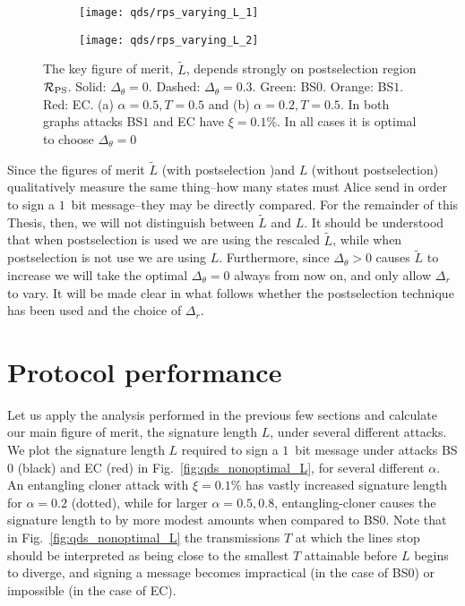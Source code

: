 \begin{figure}[htp]
\captionsetup{width=0.8\linewidth}
\centering
	\begin{subfigure}{0.49\linewidth}
		\centering
		\texttt{[image: qds/rps\_varying\_L\_1]}
		\caption{}
	\end{subfigure}
	\begin{subfigure}{0.49\linewidth}
		\centering
		\texttt{[image: qds/rps\_varying\_L\_2]}
		\caption{}
	\end{subfigure}
\caption{\label{fig:qds_L_vs_deltar} The key figure of merit, $\tilde{L}$, depends strongly on postselection region $\mathcal{R}_{\text{PS}}$. Solid: $\Delta_\theta=0$. Dashed: $\Delta_\theta = 0.3$. Green: BS$0$. Orange: BS$1$. Red: EC. (a) $\alpha = 0.5, T = 0.5$ and (b) $\alpha=0.2, T=0.5$. In both graphs attacks BS$1$ and EC have $\xi = 0.1 \%$. In all cases it is optimal to choose $\Delta_\theta = 0$}
\end{figure}

Since the figures of merit $\tilde{L}$ (with postselection )and $L$ (without postselection) qualitatively measure the same thing--how many states must Alice send in order to sign a $1$~bit message--they may be directly compared. For the remainder of this Thesis, then, we will not distinguish between $\tilde{L}$ and $L$. It should be understood that when postselection is used we are using the rescaled $\tilde{L}$, while when postselection is not use we are using $L$. Furthermore, since $\Delta_\theta > 0$ causes $\tilde{L}$ to increase we will take the optimal $\Delta_\theta=0$ always from now on, and only allow $\Delta_r$ to vary. It will be made clear in what follows whether the postselection technique has been used and the choice of $\Delta_r$.



\section{Protocol performance}\label{sec:qds_protocol_performance}
Let us apply the analysis performed in the previous few sections and calculate our main figure of merit, the signature length $L$, under several different attacks. We plot the signature length $L$ required to sign a $1$~bit message under attacks BS$0$ (black) and EC (red) in Fig.~\ref{fig:qds_nonoptimal_L}, for several different $\alpha$. An entangling cloner attack with $\xi = 0.1\%$ has vastly increased signature length for $\alpha=0.2$ (dotted), while for larger $\alpha=0.5, 0.8$, entangling-cloner causes the signature length to by more modest amounts when compared to BS$0$. Note that in Fig.~\ref{fig:qds_nonoptimal_L} the transmissions $T$ at which the lines stop should be interpreted as being close to the smallest $T$ attainable before $L$ begins to diverge, and signing a message becomes impractical (in the case of BS$0$) or impossible (in the case of EC). 






